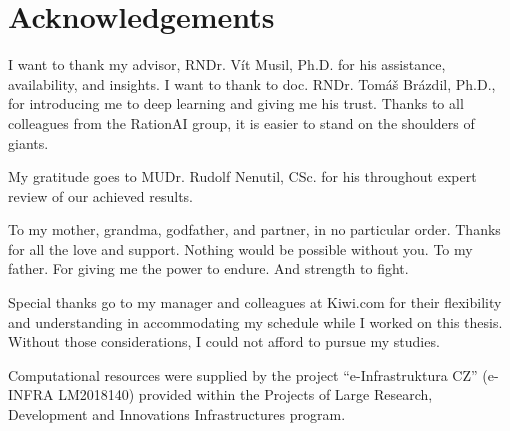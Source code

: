 \chapter*{Acknowledgements}

I want to thank my advisor, RNDr. Vít Musil, Ph.D. for his assistance, availability, and insights.
I want to thank to doc. RNDr. Tomáš Brázdil, Ph.D., for introducing me to deep learning and giving me his trust.
Thanks to all colleagues from the RationAI group, it is easier to stand on the shoulders of giants.

My gratitude goes to MUDr. Rudolf Nenutil, CSc. for his throughout expert review of our achieved results.

To my mother, grandma, godfather, and partner, in no particular order.
Thanks for all the love and support.
Nothing would be possible without you.
To my father.
For giving me the power to endure.
And strength to fight.

Special thanks go to my manager and colleagues at Kiwi.com for their flexibility and understanding in accommodating my schedule while I worked on this thesis.
Without those considerations, I could not afford to pursue my studies.

Computational resources were supplied by the project ``e-Infrastruktura CZ'' (e-INFRA LM2018140) provided within the Projects of Large Research, Development and Innovations Infrastructures program.
